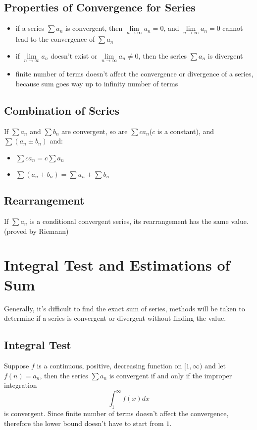 \documentclass[10pt,a4paper,oneside]{article}
\begin{document}
\subsection{Properties of Convergence for Series}\begin{itemize}
	\item if a series $\sum a_n$ is convergent, then $\lim\limits_{n \rightarrow \infty} a_n = 0$, and $\lim\limits_{n \rightarrow \infty} a_n = 0$ cannot lead to the convergence of $\sum a_n$
	\item if $\lim\limits_{n \rightarrow \infty} a_n$ doesn't exist or $\lim\limits_{n \rightarrow \infty} a_n \neq 0$, then the series  $\sum a_n$ is divergent
	\item finite number of terms doesn't affect the convergence or divergence of a series, because sum goes way up to infinity number of terms
\end{itemize}

\subsection{Combination of Series}
If $\sum a_n$ and $\sum b_n$ are convergent, so are $\sum ca_n$($c$ is a constant),  and $\sum (a_n \pm b_n)$ and:
\begin{itemize}
	\item $\sum c a_n = c \sum a_n$
	\item $\sum (a_n \pm b_n) = \sum a_n + \sum b_n$
\end{itemize}

\subsection{Rearrangement}
If $\sum a_n$ is a conditional convergent series, its rearrangement has the same value.(proved by Riemann)

\section{Integral Test and Estimations of Sum}
Generally, it's difficult to find the exact sum of series, methods will be taken to determine if a series is convergent or divergent without finding the value.
 
\subsection{Integral Test}
Suppose $f$ is a continuous, positive, decreasing function on $[1, \infty)$ and let $f(n) = a_n$, then the series $\sum a_n$ is convergent if and only if the improper integration
\[
\int_{1}^{\infty} f(x) dx
\]
is convergent. Since finite number of terms doesn't affect the convergence, therefore the lower bound doesn't have to start from $1$.
\end{document}
